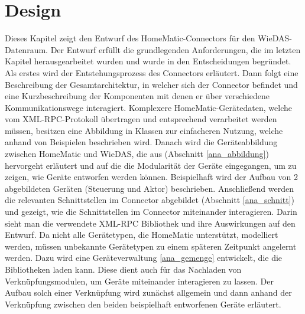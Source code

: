 \chapter{Design}
\label{design}

Dieses Kapitel zeigt den Entwurf des HomeMatic-Connectors für den WieDAS-Datenraum.
Der Entwurf erfüllt die grundlegenden Anforderungen, die im letzten Kapitel
herausgearbeitet wurden und wurde in den Entscheidungen begründet.
Als erstes wird der Entstehungsprozess des Connectors erläutert.
Dann folgt eine Beschreibung der Gesamtarchitektur, in welcher sich der Connector befindet
und eine Kurzbeschreibung der Komponenten mit denen er über verschiedene Kommunikationswege
interagiert.
Komplexere HomeMatic-Gerätedaten, welche vom XML-RPC-Protokoll übertragen und
entsprechend verarbeitet werden müssen, besitzen eine Abbildung in Klassen zur einfacheren
Nutzung, welche anhand von Beispielen beschrieben wird.
Danach wird die Geräteabbildung zwischen HomeMatic und WieDAS, die aus (Abschnitt \ref{ana_abbildung})
hervorgeht erläutert und auf die die Modularität der Geräte eingegangen, um zu zeigen,
wie Geräte entworfen werden können.
Beispielhaft wird der Aufbau von 2 abgebildeten Geräten (Steuerung und Aktor) beschrieben.
Anschließend werden die relevanten Schnittstellen im Connector abgebildet (Abschnitt \ref{ana_schnitt})
und gezeigt, wie die Schnittstellen im Connector miteinander interagieren.
Darin sieht man die verwendete XML-RPC Bibliothek und ihre Auswirkungen auf den Entwurf.
Da nicht alle Gerätetypen, die HomeMatic unterstützt, modelliert werden,
müssen unbekannte Gerätetypen zu einem späteren Zeitpunkt angelernt werden.
Dazu wird eine Geräteverwaltung \ref{ana_gemenge} entwickelt, die die Bibliotheken laden kann.
Diese dient auch für das Nachladen von Verknüpfungsmodulen, um Geräte miteinander
interagieren zu lassen.
Der Aufbau solch einer Verknüpfung wird zunächst allgemein und dann anhand der Verknüpfung
zwischen den beiden beispielhaft entworfenen Geräte erläutert.


